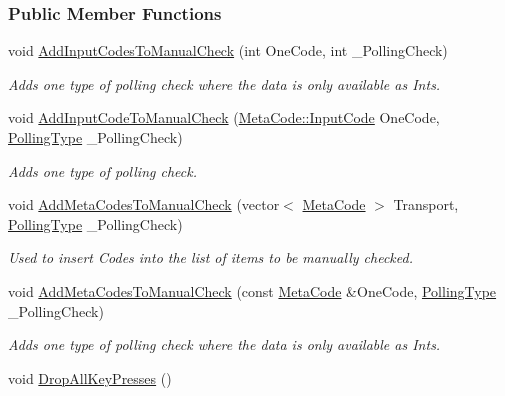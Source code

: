 \subsubsection*{Public Member Functions}
\begin{DoxyCompactItemize}
\item 
void \hyperlink{structMezzanine_1_1internal_1_1EventManagerInternalData_a0d72b807c1a1bd14194d173fcffa8d29}{AddInputCodesToManualCheck} (int OneCode, int \_\-PollingCheck)
\begin{DoxyCompactList}\small\item\em Adds one type of polling check where the data is only available as Ints. \item\end{DoxyCompactList}\item 
void \hyperlink{structMezzanine_1_1internal_1_1EventManagerInternalData_af1374a760ac44ce1b0a9e391f352a666}{AddInputCodeToManualCheck} (\hyperlink{classMezzanine_1_1MetaCode_a3b5633f0145bf3287cf53a3f05b5563c}{MetaCode::InputCode} OneCode, \hyperlink{structMezzanine_1_1internal_1_1EventManagerInternalData_a4179a167c7f67babd5aa4902dc279027}{PollingType} \_\-PollingCheck)
\begin{DoxyCompactList}\small\item\em Adds one type of polling check. \item\end{DoxyCompactList}\item 
void \hyperlink{structMezzanine_1_1internal_1_1EventManagerInternalData_addd6a9dad9a429a59633014e2ecb2caa}{AddMetaCodesToManualCheck} (vector$<$ \hyperlink{classMezzanine_1_1MetaCode}{MetaCode} $>$ Transport, \hyperlink{structMezzanine_1_1internal_1_1EventManagerInternalData_a4179a167c7f67babd5aa4902dc279027}{PollingType} \_\-PollingCheck)
\begin{DoxyCompactList}\small\item\em Used to insert Codes into the list of items to be manually checked. \item\end{DoxyCompactList}\item 
void \hyperlink{structMezzanine_1_1internal_1_1EventManagerInternalData_a19c57d0654711e2b3abeadb42bcaaa47}{AddMetaCodesToManualCheck} (const \hyperlink{classMezzanine_1_1MetaCode}{MetaCode} \&OneCode, \hyperlink{structMezzanine_1_1internal_1_1EventManagerInternalData_a4179a167c7f67babd5aa4902dc279027}{PollingType} \_\-PollingCheck)
\begin{DoxyCompactList}\small\item\em Adds one type of polling check where the data is only available as Ints. \item\end{DoxyCompactList}\item 
\hypertarget{structMezzanine_1_1internal_1_1EventManagerInternalData_aa1da2f0cd037bfb5013a1e7ca5844ca0}{
void \hyperlink{structMezzanine_1_1internal_1_1EventManagerInternalData_aa1da2f0cd037bfb5013a1e7ca5844ca0}{DropAllKeyPresses} ()}
\label{structMezzanine_1_1internal_1_1EventManagerInternalData_aa1da2f0cd037bfb5013a1e7ca5844ca0}


\end{DoxyCompactItemize}

